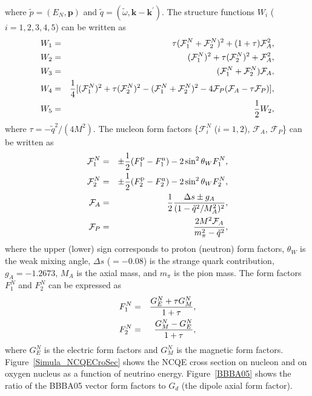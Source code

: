 where $\tilde{p}=(E_{N}, \bm{p})$ and $\tilde{q}=(\tilde{\omega}, \bm{k} - \bm{k}^{\prime})$.
The structure functions $W_{i}$ ($i=1,2,3,4,5$) can be written as
\begin{eqnarray}
	W_{1}&=&\tau(\mathcal{F}^{N}_{1} + \mathcal{F}^{N}_{2})^{2} + (1 + \tau)\mathcal{F}^{2}_{A}, \nonumber \\
	W_{2}&=&(\mathcal{F}^{N}_{1})^{2} + \tau(\mathcal{F}^{N}_{2})^{2} + \mathcal{F}^{2}_{A}, \nonumber \\
	W_{3}&=&(\mathcal{F}^{N}_{1} + \mathcal{F}^{N}_{2})\mathcal{F}_{A}, \nonumber \\
	W_{4}&=&{1 \over 4}[(\mathcal{F}^{N}_{1})^{2} + \tau(\mathcal{F}^{N}_{2})^{2} - (\mathcal{F}^{N}_{1} + \mathcal{F}^{N}_{2})^{2} - 4\mathcal{F}_{P}(\mathcal{F}_{A} - \tau\mathcal{F}_{P})], \nonumber \\
	W_{5}&=&{1 \over 2}W_{2},
\end{eqnarray}
where $\tau = -\tilde{q}^{2}/(4M^{2})$.
The nucleon form factors \{$\mathcal{F}^{N}_{i}$ ($i=1,2$), $\mathcal{F}_{A}$, $\mathcal{F}_{P}$\} can be written as
\begin{eqnarray}
	\mathcal{F}^{N}_{1}&=&\pm{1 \over 2}(F^{{\rm p}}_{1} - F^{{\rm n}}_{1}) - 2\sin^{2}\theta_{W}F^{N}_{1}, \nonumber \\
	\mathcal{F}^{N}_{2}&=&\pm{1 \over 2}(F^{{\rm p}}_{2} - F^{{\rm n}}_{2}) - 2\sin^{2}\theta_{W}F^{N}_{2}, \nonumber \\
	\mathcal{F}_{A}    &=&{1 \over 2}{\Delta s \pm g_{A} \over (1 - \tilde{q}^{2}/M_{A}^{2})^{2}}, \nonumber \\
	\mathcal{F}_{P}    &=&{2M^{2}\mathcal{F}_{A} \over m_{\pi}^{2} - \tilde{q}^{2}},
\end{eqnarray}
where the upper (lower) sign corresponds to proton (neutron) form factors, $\theta_{W}$ is the weak mixing angle, $\Delta s$ ($=-0.08$) is the strange quark contribution, $g_{A}=-1.2673$, $M_{A}$ is the axial mass, and $m_{\pi}$ is the pion mass.
The form factors $F^{N}_{1}$ and $F^{N}_{2}$ can be expressed as
\begin{eqnarray}
	F^{N}_{1}&=&{G^{N}_{E} + \tau G^{N}_{M} \over 1 + \tau}, \nonumber \\
	F^{N}_{2}&=&{G^{N}_{M} - G^{N}_{E} \over 1 + \tau},
\end{eqnarray}
where $G^{N}_{E}$ is the electric form factors and $G^{N}_{M}$ is the magnetic form factors.
Figure~\ref{Simula_NCQECroSec} shows the NCQE cross section on nucleon and on oxygen nucleus as a function of neutrino energy.
Figure~\ref{BBBA05} shows the ratio of the BBBA05 vector form factors to $G_{d}$ (the dipole axial form factor).\\
